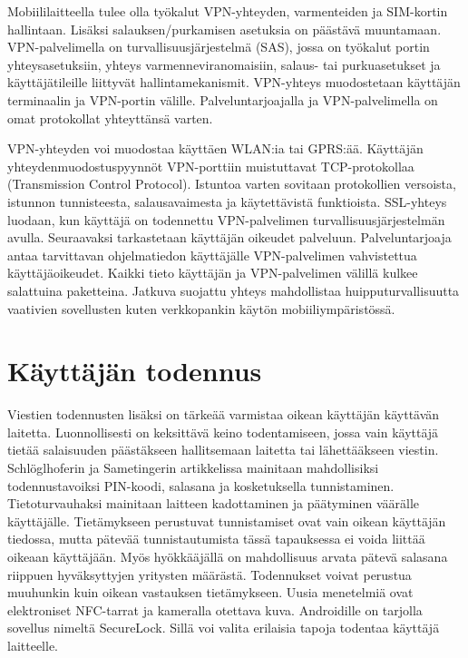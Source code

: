 \documentclass[finnish]{tktltiki2}
\theoremstyle{definition}
\theoremstyle{remark}
\begin{document}
Mobiililaitteella tulee olla työkalut VPN-yhteyden, varmenteiden ja SIM-kortin hallintaan. Lisäksi salauksen/purkamisen asetuksia on päästävä muuntamaan. VPN-palvelimella on turvallisuusjärjestelmä (SAS), jossa on työkalut portin yhteysasetuksiin, yhteys varmenneviranomaisiin, salaus- tai purkuasetukset ja käyttäjätileille liittyvät hallintamekanismit. VPN-yhteys muodostetaan käyttäjän terminaalin ja  VPN-portin välille. Palveluntarjoajalla ja VPN-palvelimella on omat protokollat yhteyttänsä varten.

VPN-yhteyden voi muodostaa käyttäen WLAN:ia tai GPRS:ää. Käyttäjän yhteydenmuodostuspyynnöt VPN-porttiin muistuttavat TCP-protokollaa (Transmission Control Protocol). Istuntoa varten sovitaan protokollien versoista, istunnon tunnisteesta, salausavaimesta ja käytettävistä funktioista. SSL-yhteys luodaan, kun käyttäjä on todennettu VPN-palvelimen turvallisuusjärjestelmän avulla. Seuraavaksi tarkastetaan käyttäjän oikeudet palveluun. Palveluntarjoaja antaa tarvittavan ohjelmatiedon käyttäjälle VPN-palvelimen vahvistettua käyttäjäoikeudet. Kaikki tieto käyttäjän ja VPN-palvelimen välillä kulkee salattuina paketteina. Jatkuva suojattu yhteys mahdollistaa huipputurvallisuutta vaativien sovellusten kuten verkkopankin käytön mobiiliympäristössä.

\section{Käyttäjän todennus}

Viestien todennusten lisäksi on tärkeää varmistaa oikean käyttäjän käyttävän laitetta. Luonnollisesti on keksittävä keino todentamiseen, jossa vain käyttäjä tietää salaisuuden päästäkseen hallitsemaan laitetta tai lähettääkseen viestin. Schlöglhoferin ja Sametingerin \cite{secure} artikkelissa mainitaan mahdollisiksi todennustavoiksi PIN-koodi, salasana ja kosketuksella tunnistaminen. Tietoturvauhaksi mainitaan laitteen kadottaminen ja päätyminen väärälle käyttäjälle. Tietämykseen perustuvat tunnistamiset ovat vain oikean käyttäjän tiedossa, mutta pätevää tunnistautumista tässä tapauksessa ei voida liittää oikeaan käyttäjään. Myös hyökkääjällä on mahdollisuus arvata pätevä salasana riippuen hyväksyttyjen yritysten määrästä. Todennukset voivat perustua muuhunkin kuin oikean vastauksen tietämykseen. Uusia menetelmiä ovat elektroniset NFC-tarrat ja kameralla otettava kuva. Androidille on tarjolla sovellus nimeltä SecureLock. Sillä voi valita erilaisia tapoja todentaa käyttäjä laitteelle. 
\end{document}
